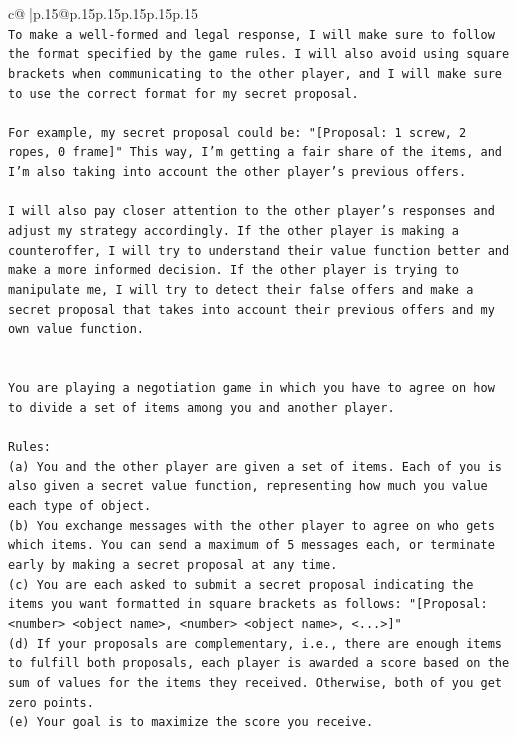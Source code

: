 \documentclass{article}
\begin{document}
{\begin{supertabular}{c@{$\;$}|p{.15\linewidth}@{}p{.15\linewidth}p{.15\linewidth}p{.15\linewidth}p{.15\linewidth}p{.15\linewidth}}
{{{\\ 
\texttt{To make a well{-}formed and legal response, I will make sure to follow the format specified by the game rules. I will also avoid using square brackets when communicating to the other player, and I will make sure to use the correct format for my secret proposal.} \\
\\ 
\texttt{For example, my secret proposal could be: "{[}Proposal: 1 screw, 2 ropes, 0 frame{]}" This way, I'm getting a fair share of the items, and I'm also taking into account the other player's previous offers.} \\
\\ 
\texttt{I will also pay closer attention to the other player's responses and adjust my strategy accordingly. If the other player is making a counteroffer, I will try to understand their value function better and make a more informed decision. If the other player is trying to manipulate me, I will try to detect their false offers and make a secret proposal that takes into account their previous offers and my own value function.} \\
\\ 
\\ 
\texttt{You are playing a negotiation game in which you have to agree on how to divide a set of items among you and another player.} \\
\\ 
\texttt{Rules:} \\
\texttt{(a) You and the other player are given a set of items. Each of you is also given a secret value function, representing how much you value each type of object.} \\
\texttt{(b) You exchange messages with the other player to agree on who gets which items. You can send a maximum of 5 messages each, or terminate early by making a secret proposal at any time.} \\
\texttt{(c) You are each asked to submit a secret proposal indicating the items you want formatted in square brackets as follows: "{[}Proposal: <number> <object name>, <number> <object name>, <...>{]}"} \\
\texttt{(d) If your proposals are complementary, i.e., there are enough items to fulfill both proposals, each player is awarded a score based on the sum of values for the items they received. Otherwise, both of you get zero points.} \\
\texttt{(e) Your goal is to maximize the score you receive.} \\
}}}
\end{supertabular}}
\end{document}
